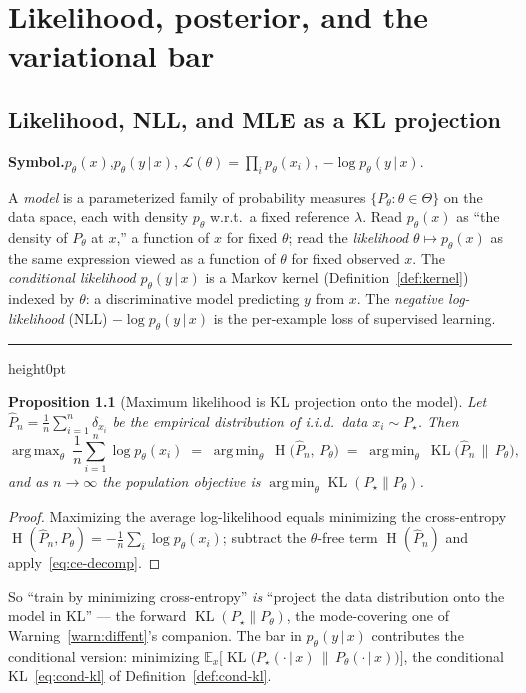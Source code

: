 \documentclass[11pt,oneside]{report}
\theoremstyle{plain}
\newtheorem{proposition}[theorem]{Proposition}
\theoremstyle{definition}
\theoremstyle{remark}
\newenvironment{mlentry}[1]%
  {\par\medskip\noindent\textbf{Symbol.}\quad #1\par\nobreak\smallskip}%
  {\par\medskip\hrule height0pt\medskip}
\newcommand{\E}{\mathbb{E}}
\newcommand{\given}{\,\vert\,}
\DeclareMathOperator{\KL}{KL}
\DeclareMathOperator*{\argmin}{arg\,min}
\DeclareMathOperator*{\argmax}{arg\,max}
\DeclareMathOperator{\Ent}{H}        %
\numberwithin{equation}{chapter}
\begin{document}
\chapter{Likelihood, posterior, and the variational bar}

\section{Likelihood, NLL, and MLE as a KL projection}\label{sec:mle}

\begin{mlentry}{$p_\theta(x)$,\quad $p_\theta(y\given x)$,\quad
$\mathcal L(\theta)=\prod_i p_\theta(x_i)$,\quad
$-\log p_\theta(y\given x)$.}
A \emph{model} is a parameterized family of probability measures
$\{P_\theta:\theta\in\Theta\}$ on the data space, each with density
$p_\theta$ w.r.t.\ a fixed reference $\lambda$. Read $p_\theta(x)$ as ``the
density of $P_\theta$ at $x$,'' a function of $x$ for fixed $\theta$; read
the \emph{likelihood} $\theta\mapsto p_\theta(x)$ as the same expression
viewed as a function of $\theta$ for fixed observed $x$. The
\emph{conditional likelihood} $p_\theta(y\given x)$ is a Markov kernel
(Definition~\ref{def:kernel}) indexed by $\theta$: a discriminative model
predicting $y$ from $x$. The \emph{negative log-likelihood} (NLL)
$-\log p_\theta(y\given x)$ is the per-example loss of supervised learning.
\end{mlentry}

\begin{proposition}[Maximum likelihood is KL projection onto the model]
\label{prop:mle-kl}
Let $\widehat P_n=\frac1n\sum_{i=1}^n\delta_{x_i}$ be the empirical
distribution of i.i.d.\ data $x_i\sim P_\star$. Then
\begin{equation}
  \argmax_{\theta}\ \frac1n\sum_{i=1}^n\log p_\theta(x_i)
  \;=\;\argmin_{\theta}\ \Ent\!\bigl(\widehat P_n,\,P_\theta\bigr)
  \;=\;\argmin_{\theta}\ \KL\!\bigl(\widehat P_n\,\big\|\,P_\theta\bigr),
\end{equation}
and as $n\to\infty$ the population objective is
$\argmin_\theta \KL(P_\star\|P_\theta)$.
\end{proposition}
\begin{proof}
Maximizing the average log-likelihood equals minimizing the cross-entropy
$\Ent(\widehat P_n,P_\theta)=-\frac1n\sum_i\log p_\theta(x_i)$; subtract the
$\theta$-free term $\Ent(\widehat P_n)$ and apply~\eqref{eq:ce-decomp}.
\end{proof}

So ``train by minimizing cross-entropy'' \emph{is} ``project the data
distribution onto the model in KL'' --- the forward $\KL(P_\star\|P_\theta)$,
the mode-covering one of Warning~\ref{warn:diffent}'s companion. The bar in
$p_\theta(y\given x)$ contributes the conditional version: minimizing
$\E_{x}\bigl[\KL\bigl(P_\star(\cdot\given x)\,\|\,P_\theta(\cdot\given
x)\bigr)\bigr]$, the conditional KL~\eqref{eq:cond-kl} of
Definition~\ref{def:cond-kl}.
\end{document}
